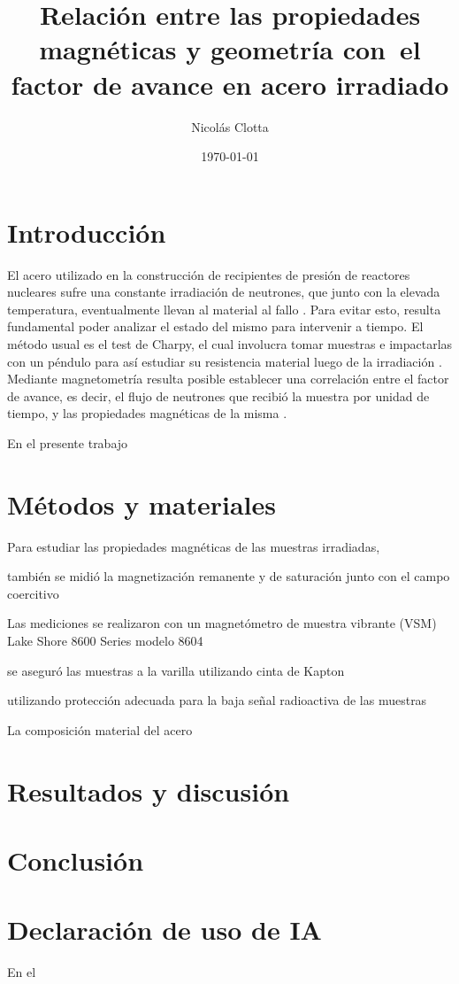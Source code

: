 \documentclass[aps,prd,a4paper,10pt, twocolumn,amsmath,showpacs,superscriptaddress,nofootinbib,preprintnumbers,notitlepage]{revtex4-2}
\begin{document}
\title{\LARGE Relación entre las propiedades magnéticas y geometría con~el factor de avance en acero irradiado}

\author{Nicolás Clotta}

\date[Fechado: ]{\today}
\begin{abstract}
    \noindent
\end{abstract}

\maketitle

\section{Introducción}
El acero utilizado en la construcción de recipientes de presión de reactores nucleares sufre una constante irradiación de neutrones, que junto con la elevada temperatura, eventualmente llevan al material al fallo \cite{}. Para evitar esto, resulta fundamental poder analizar el estado del mismo para intervenir a tiempo. El método usual es el test de Charpy, el cual involucra tomar muestras e impactarlas con un péndulo para así estudiar su resistencia material luego de la irradiación \cite{KEMPF2013}. Mediante magnetometría resulta posible establecer una correlación entre el factor de avance, es decir, el flujo de neutrones que recibió la muestra por unidad de tiempo, y las propiedades magnéticas de la misma \cite{KOBAYASHI2012, PASSANANTE2026}.

En el presente trabajo 

\section{Métodos y materiales}
Para estudiar las propiedades magnéticas de las muestras irradiadas,



también se midió la magnetización remanente y de saturación junto con el campo coercitivo



Las mediciones se realizaron con un magnetómetro de muestra vibrante (VSM) Lake Shore 8600 Series modelo 8604



se aseguró las muestras a la varilla utilizando cinta de Kapton


utilizando protección adecuada para la baja señal radioactiva de las muestras


La composición material del acero 

\section{Resultados y discusión}

\section{Conclusión}

\section{Declaración de uso de IA}
En el


\end{document}
